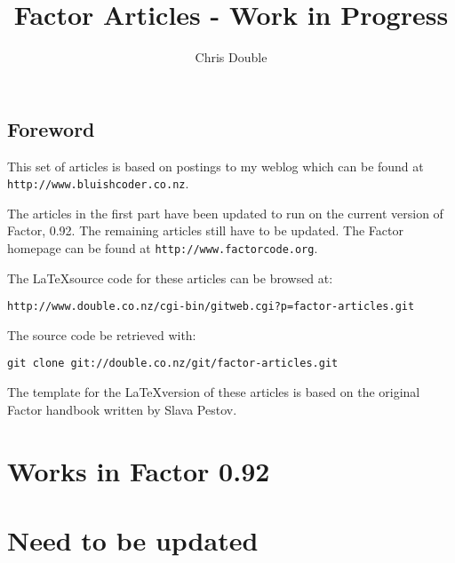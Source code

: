 \documentclass{book}
\begin{document}
\title{Factor Articles - Work in Progress}

\author{Chris Double}

\maketitle
\tableofcontents{}

\chapter*{Foreword}

This set of articles is based on postings to my weblog which can be found at \verb|http://www.bluishcoder.co.nz|.

The articles in the first part have been updated to run on the current version of Factor, 0.92. The remaining articles still have to be updated. The Factor homepage can be found at \verb|http://www.factorcode.org|.

The \LaTeX source code for these articles can be browsed at:
\begin{verbatim}
http://www.double.co.nz/cgi-bin/gitweb.cgi?p=factor-articles.git
\end{verbatim}

The source code be retrieved with:
\begin{verbatim}
git clone git://double.co.nz/git/factor-articles.git
\end{verbatim}

The template for the \LaTeX version of these articles is based on the original Factor handbook written by Slava Pestov.

\part{Works in Factor 0.92}






\part{Need to be updated}















\end{document}
